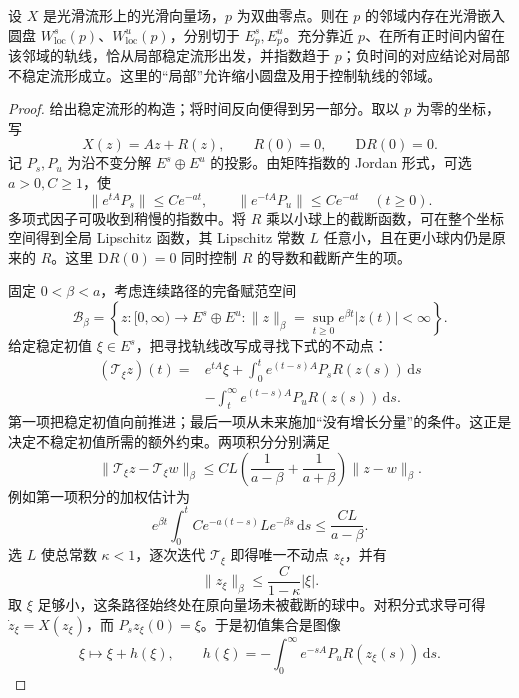 \begin{theorem}[局部稳定流形定理]\label{g2:thm:hyperbolic-stable-manifold}
	设 \(X\) 是光滑流形上的光滑向量场，\(p\) 为双曲零点。则在 \(p\) 的邻域内存在光滑嵌入圆盘 \(W^s_{\mathrm{loc}}(p)\)、\(W^u_{\mathrm{loc}}(p)\)，分别切于 \(E^s_p,E^u_p\)。充分靠近 \(p\)、在所有正时间内留在该邻域的轨线，恰从局部稳定流形出发，并指数趋于 \(p\)；负时间的对应结论对局部不稳定流形成立。这里的“局部”允许缩小圆盘及用于控制轨线的邻域。
\end{theorem}
\begin{proof}
	给出稳定流形的构造；将时间反向便得到另一部分。取以 \(p\) 为零的坐标，写
	\[
		X(z)=Az+R(z),\qquad R(0)=0,\qquad \mathrm DR(0)=0.
	\]
	记 \(P_s,P_u\) 为沿不变分解 \(E^s\oplus E^u\) 的投影。由矩阵指数的 Jordan 形式，可选 \(a>0,C\ge1\)，使
	\[
		\lVert e^{tA}P_s\rVert\le Ce^{-at},\qquad
		\lVert e^{-tA}P_u\rVert\le Ce^{-at}\quad(t\ge0).
	\]
	多项式因子可吸收到稍慢的指数中。将 \(R\) 乘以小球上的截断函数，可在整个坐标空间得到全局 Lipschitz 函数，其 Lipschitz 常数 \(L\) 任意小，且在更小球内仍是原来的 \(R\)。这里 \(\mathrm DR(0)=0\) 同时控制 \(R\) 的导数和截断产生的项。

	固定 \(0<\beta<a\)，考虑连续路径的完备赋范空间
	\[
		\mathcal B_\beta=
		\left\{z:[0,\infty)\to E^s\oplus E^u:
		\lVert z\rVert_\beta=\sup_{t\ge0}e^{\beta t}|z(t)|<\infty\right\}.
	\]
	给定稳定初值 \(\xi\in E^s\)，把寻找轨线改写成寻找下式的不动点：
	\begin{equation}\label{g2:eq:stable-integral-equation}
		\begin{aligned}
			(\mathcal T_\xi z)(t)
			={}&e^{tA}\xi+\int_0^t e^{(t-s)A}P_sR(z(s))\,\mathrm ds\\
			&-\int_t^\infty e^{(t-s)A}P_uR(z(s))\,\mathrm ds.
		\end{aligned}
	\end{equation}
	第一项把稳定初值向前推进；最后一项从未来施加“没有增长分量”的条件。这正是决定不稳定初值所需的额外约束。两项积分分别满足
	\[
		\lVert\mathcal T_\xi z-\mathcal T_\xi w\rVert_\beta
		\le CL\left(\frac1{a-\beta}+\frac1{a+\beta}\right)
		\lVert z-w\rVert_\beta.
	\]
	例如第一项积分的加权估计为
	\[
		e^{\beta t}\int_0^t Ce^{-a(t-s)}L e^{-\beta s}\,\mathrm ds
		\le \frac{CL}{a-\beta}.
	\]
	选 \(L\) 使总常数 \(\kappa<1\)，逐次迭代 \(\mathcal T_\xi\) 即得唯一不动点 \(z_\xi\)，并有
	\[
		\lVert z_\xi\rVert_\beta\le\frac{C}{1-\kappa}|\xi|.
	\]
	取 \(\xi\) 足够小，这条路径始终处在原向量场未被截断的球中。对积分式求导可得 \(\dot z_\xi=X(z_\xi)\)，而 \(P_sz_\xi(0)=\xi\)。于是初值集合是图像
	\[
		\xi\longmapsto \xi+h(\xi),\qquad
		h(\xi)=-\int_0^\infty e^{-sA}P_uR(z_\xi(s))\,\mathrm ds.
	\]


\end{proof}

